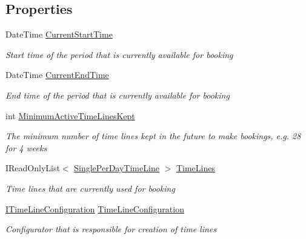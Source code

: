 \subsection*{Properties}
\begin{DoxyCompactItemize}
\item 
Date\+Time \hyperlink{class_general_health_care_elements_1_1_booking_models_1_1_general_booking_model_a078fedbdba4ec3adb3c01f05697bf12b}{Current\+Start\+Time}
\begin{DoxyCompactList}\small\item\em Start time of the period that is currently available for booking \end{DoxyCompactList}\item 
Date\+Time \hyperlink{class_general_health_care_elements_1_1_booking_models_1_1_general_booking_model_a55ca5633f2692b20bb9e109fa7ae8598}{Current\+End\+Time}
\begin{DoxyCompactList}\small\item\em End time of the period that is currently available for booking \end{DoxyCompactList}\item 
int \hyperlink{class_general_health_care_elements_1_1_booking_models_1_1_general_booking_model_ac7daa3603aa4062600489bbc449aa565}{Minimum\+Active\+Time\+Lines\+Kept}
\begin{DoxyCompactList}\small\item\em The minimum number of time lines kept in the future to make bookings, e.\+g. 28 for 4 weeks \end{DoxyCompactList}\item 
I\+Read\+Only\+List$<$ \hyperlink{class_general_health_care_elements_1_1_booking_models_1_1_single_per_day_time_line}{Single\+Per\+Day\+Time\+Line} $>$ \hyperlink{class_general_health_care_elements_1_1_booking_models_1_1_general_booking_model_a07ec597c2d4ddd92525a1bfcdf0c44c7}{Time\+Lines}
\begin{DoxyCompactList}\small\item\em Time lines that are currently used for booking \end{DoxyCompactList}\item 
\hyperlink{interface_general_health_care_elements_1_1_booking_models_1_1_i_time_line_configuration}{I\+Time\+Line\+Configuration} \hyperlink{class_general_health_care_elements_1_1_booking_models_1_1_general_booking_model_ae9c16f1b889c7f7b936afd196bbe573a}{Time\+Line\+Configuration}
\begin{DoxyCompactList}\small\item\em Configurator that is responsible for creation of time lines \end{DoxyCompactList}\end{DoxyCompactItemize}



